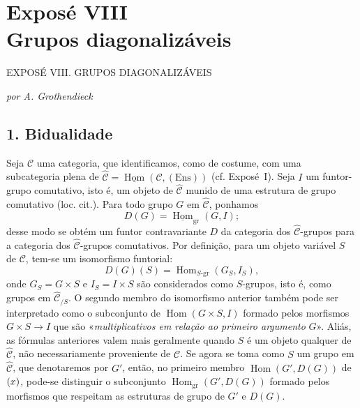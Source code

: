 
\chapter*{Exposé VIII\\Grupos diagonalizáveis}
%
  {EXPOSÉ VIII. GRUPOS DIAGONALIZÁVEIS}

\begin{center}
  \textit{por A. Grothendieck}
\end{center}

\section*{1. Bidualidade}

Seja \(\mathscr C\) uma categoria, que identificamos, como de costume, com uma
subcategoria plena de \(\widehat{\mathscr C}
=\underline{\operatorname{Hom}}(\mathscr C,(\mathrm{Ens}))\)
(cf. Exposé~I). Seja \(I\) um funtor-grupo comutativo, isto é, um objeto de
\(\widehat{\mathscr C}\) munido de uma estrutura de grupo comutativo
(loc. cit.). Para todo grupo \(G\) em \(\widehat{\mathscr C}\), ponhamos
\[
  D(G)=\underline{\operatorname{Hom}}_{\mathrm{gr}}(G,I);
\]
desse modo se obtém um funtor contravariante \(D\) da categoria dos
\(\widehat{\mathscr C}\)-grupos para a categoria dos
\(\widehat{\mathscr C}\)-grupos comutativos. Por definição, para um objeto
variável \(S\) de \(\mathscr C\), tem-se um isomorfismo funtorial:
\begin{equation}
  \tag{x}
  D(G)(S)=\operatorname{Hom}_{S\text{-}\mathrm{gr}}(G_S,I_S),
\end{equation}
onde \(G_S=G\times S\) e \(I_S=I\times S\) são considerados como
\(S\)-grupos, isto é, como grupos em \(\widehat{\mathscr C}_{/S}\).
O segundo membro do isomorfismo anterior também pode ser interpretado como
o subconjunto de \(\operatorname{Hom}(G\times S,I)\) formado pelos morfismos
\(G\times S\to I\) que são «\emph{multiplicativos em relação ao primeiro
argumento} \(G\)». Aliás, as fórmulas anteriores valem mais geralmente
quando \(S\) é um objeto qualquer de \(\widehat{\mathscr C}\), não
necessariamente proveniente de \(\mathscr C\). Se agora se toma como
\(S\) um grupo em \(\widehat{\mathscr C}\), que denotaremos por \(G'\),
então, no primeiro membro \(\operatorname{Hom}(G',D(G))\) de
\(\SGARefLink{sga3:viii:eq:1:x}{(x)}\), pode-se distinguir o subconjunto
\(\operatorname{Hom}_{\mathrm{gr}}(G',D(G))\) formado pelos morfismos
que respeitam as estruturas de grupo de \(G'\) e \(D(G)\).

